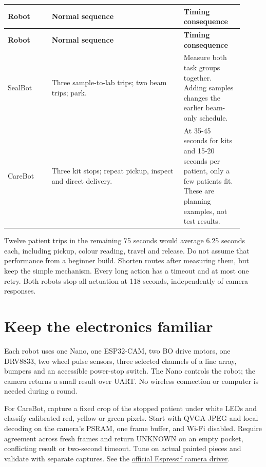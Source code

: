 \documentclass[10pt,a4paper]{article}
\begin{document}
\small\begin{longtable}{@{}>{\raggedright\arraybackslash}p{0.17\linewidth}>{\raggedright\arraybackslash}p{0.51\linewidth}>{\raggedright\arraybackslash}p{0.23\linewidth}@{}}
\toprule
\textbf{Robot} & \textbf{Normal sequence} & \textbf{Timing consequence} \\
\midrule\endfirsthead
\toprule\textbf{Robot} & \textbf{Normal sequence} & \textbf{Timing consequence} \\\midrule\endhead
SealBot & Three sample-to-lab trips; two beam trips; park. & Measure both task groups together. Adding samples changes the earlier beam-only schedule. \\[3pt]
CareBot & Three kit stops; repeat pickup, inspect and direct delivery. & At 35-45 seconds for kits and 15-20 seconds per patient, only a few patients fit. These are planning examples, not test results. \\[3pt]
\bottomrule\end{longtable}\normalsize
Twelve patient trips in the remaining 75 seconds would average 6.25 seconds each, including pickup, colour reading, travel and release. Do not assume that performance from a beginner build. Shorten routes after measuring them, but keep the simple mechanism. Every long action has a timeout and at most one retry. Both robots stop all actuation at 118 seconds, independently of camera responses.

\section{Keep the electronics familiar}
Each robot uses one Nano, one ESP32-CAM, two BO drive motors, one DRV8833, two wheel pulse sensors, three selected channels of a line array, bumpers and an accessible power-stop switch. The Nano controls the robot; the camera returns a small result over UART. No wireless connection or computer is needed during a round.

For CareBot, capture a fixed crop of the stopped patient under white LEDs and classify calibrated red, yellow or green pixels. Start with QVGA JPEG and local decoding on the camera's PSRAM, one frame buffer, and Wi-Fi disabled. Require agreement across fresh frames and return UNKNOWN on an empty pocket, conflicting result or two-second timeout. Tune on actual painted pieces and validate with separate captures. See the \href{https://github.com/espressif/esp32-camera}{official Espressif camera driver}.
\end{document}
